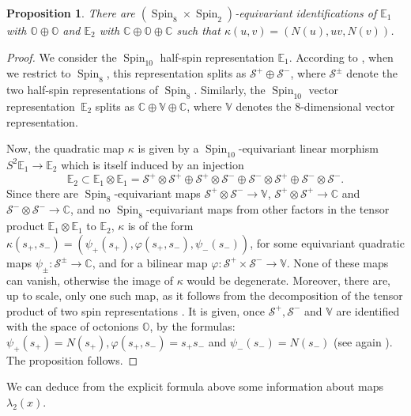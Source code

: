 \documentclass[JEP,XML,SOM,Unicode,NoFloatCountersInSection]{cedram}
\let\mathcal\mathscr
\newcommand{\citestar}[3]{\cite[#3]{#1}}
\theoremstyle{plain}
\newtheorem{prop}[theo]{Proposition}
\theoremstyle{definition}
\DeclareMathOperator{\Spin}{Spin}
\newcommand{\cS}{\mathcal{S}}
\newcommand{\bC}{\mathbb{C}}
\newcommand{\bE}{\mathbb{E}}
\newcommand{\bO}{\mathbb{O}}
\newcommand{\bV}{\mathbb{V}}
\begin{document}
\begin{prop}
\label{prop:spin-10}
There are $(\Spin_8 \times \Spin_2)$-equivariant identifications
of $\bE_1$ with $\bO \oplus \bO$ and $\bE_2$ with $\bC \oplus \bO \oplus \bC$
such that $\kappa(u,v)=(N(u),uv,N(v))$.
\end{prop}
\begin{proof}
We consider the $\Spin_{10}$ half-spin representation $\bE_1$. According to \cite{chevalley}, when we
restrict to $\Spin_8$, this representation splits as $\cS^+ \oplus \cS^-$, where $\cS^\pm$ denote the two
half-spin representations of $\Spin_8$. Similarly, the $\Spin_{10}$ vector representation~$\bE_2$ splits as
$\bC \oplus \bV \oplus \bC$, where $\bV$ denotes the $8$-dimensional vector representation.

Now, the quadratic map $\kappa$ is given by a $\Spin_{10}$-equivariant linear morphism
\hbox{$S^2 \bE_1 \to \bE_2$} which is itself induced by an
injection
$$\bE_2 \subset \bE_1 \otimes \bE_1 =
\cS^+ \otimes \cS^+ \oplus \cS^+ \otimes \cS^- \oplus \cS^- \otimes \cS^+ \oplus \cS^- \otimes \cS^-.$$
Since there are $\Spin_8$-equivariant maps $\cS^+ \otimes \cS^- \to \bV$,
$\cS^+ \otimes \cS^+ \to \bC$ and $\cS^- \otimes \cS^- \to \bC$, and no $\Spin_8$-equivariant maps from other
factors in the tensor product $\bE_1 \otimes \bE_1$ to $\bE_2$, $\kappa$ is of the form
$\kappa(s_+,s_-) = (\psi_+(s_+), \varphi(s_+,s_-), \psi_-(s_-))$, for some equivariant
quadratic maps $\psi_\pm: \cS^\pm \to \bC$, and for a bilinear map $\varphi:\cS^+ \times \cS^- \to \bV$.
None of these maps can vanish, otherwise the image of $\kappa$
would be degenerate. Moreover, there are, up to scale, only one such map, as it follows from
the decomposition of the tensor product of two spin representations
\citestar{chevalley}*{}.
It is given,
once $\cS^+,\cS^-$ and $\bV$ are identified with the space of octonions $\bO$, by the formulas:
$\psi_+(s_+)=N(s_+),\varphi(s_+,s_-)=s_+s_-$ and $\psi_-(s_-)=N(s_-)$
(see again \citestar{chevalley}*{}). The proposition follows.
\end{proof}

We can deduce from the explicit formula above some information about maps~$\lambda_2(x)$.
\end{document}

